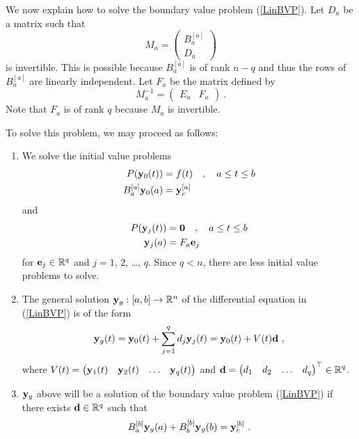 We now explain how to solve the boundary value problem (\ref{LinBVP}).
Let $D_a$ be a  matrix such that
\[
M_a = \begin{pmatrix} B_a^{[a]} \\ D_a \end{pmatrix}
\]
is invertible. This is possible because $B_a^{[a]}$ is of rank $n-q$ and
thus the rows of $B_a^{[a]}$ are linearly independent.  Let $F_a$ be the
 matrix defined by 
\[
M_a^{-1} = \begin{pmatrix} E_a & F_a \end{pmatrix} \ .
\]
Note that $F_a$ is of rank $q$ because $M_a$ is invertible.

To solve this problem, we may proceed as follows:

\begin{algo}
\begin{enumerate}
\item We solve the initial value problems
\begin{align}
P(\mathbf{y}_0(t)) &= f(t) \quad , \quad a \leq t \leq b \nonumber \\
B_a^{[a]} \mathbf{y}_0(a) &= \mathbf{y}_{c}^{[a]} \label{FiYccond1}
\end{align}
and
\begin{align*}
P(\mathbf{y}_j(t)) &= \mathbf{0} \quad , \quad a \leq t \leq b \\
\mathbf{y}_j(a) &= F_a\mathbf{e}_j
\end{align*}
for $\mathbf{e}_j \in \mathbb{R}^q$ and $j=1$, $2$, \ldots, $q$.  Since $q < n$,
there are less initial value problems to solve.
\item The general solution $\mathbf{y}_g:[a,b]\to \mathbb{R}^n$ of the differential
equation in (\ref{LinBVP}) is of the form
\[
\mathbf{y}_g(t) = \mathbf{y}_0(t) + \sum_{j=1}^q d_j \mathbf{y}_j(t) =
\mathbf{y}_0(t) + V(t) \mathbf{d} \ ,
\]
where
$\displaystyle V(t) = \begin{pmatrix}
\mathbf{y}_1(t) & \mathbf{y}_2(t) & \ldots & \mathbf{y}_q(t) \end{pmatrix}$
and $\displaystyle \mathbf{d} =
\begin{pmatrix} d_1 & d_2 & \ldots & d_q \end{pmatrix}^\top \in \mathbb{R}^q$.
\item $\mathbf{y}_g$ above will be a solution of the boundary value
problem (\ref{LinBVP}) if there exists $\mathbf{d} \in \mathbb{R}^q$
such that
\begin{equation} \label{RForm}
B_a^{[b]} \VEC{y}_g(a) + B_b^{[b]} \VEC{y}_g(b) = \VEC{y}_{c}^{[b]} \ .
\end{equation}
\end{enumerate}
\end{algo}

